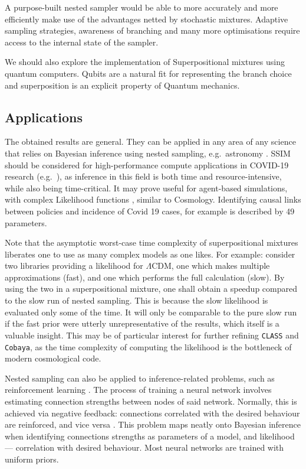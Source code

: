 \documentclass[usenatbib]{mnras}
\begin{document}
A purpose-built nested sampler would be able to more accurately and
more efficiently make use of the advantages netted by stochastic
mixtures. Adaptive sampling strategies, awareness of branching and
many more optimisations require access to the internal state of the
sampler.

We should also explore the implementation of Superpositional mixtures
using quantum computers. Qubits are a natural fit for representing the
branch choice and superposition is an explicit property of Quantum
mechanics.

\subsection{Applications}\label{sec:applications}
The obtained results are general. They can be applied in any area of
any science that relies on Bayesian inference using nested sampling,
e.g.~astronomy \citep{Casado_2016}. SSIM should be considered for
high-performance compute applications in COVID-19 research
(e.g.~\cite{Covid1,Covid2}), as inference in this field is both time
and resource-intensive, while also being time-critical. It may prove
useful for agent-based simulations, with complex Likelihood functions
\citep{Covid2}, similar to Cosmology. Identifying causal links between
policies and incidence of Covid 19 cases, for example is described by
49 parameters.

Note that the asymptotic worst-case time complexity of superpositional
mixtures liberates one to use as many complex models as one likes. For
example: consider two libraries providing a likelihood for
\(\Lambda\)CDM, one which makes multiple approximations (fast), and
one which performs the full calculation (slow). By using the two in a
superpositional mixture, one shall obtain a speedup compared to the
slow run of nested sampling. This is because the slow likelihood is
evaluated only some of the time. It will only be comparable to the
pure slow run if the fast prior were utterly unrepresentative of the
results, which itself is a valuable insight. This may be of particular
interest for further refining \texttt{CLASS} and \texttt{Cobaya}, as
the time complexity of computing the likelihood is the bottleneck of
modern cosmological code.

Nested sampling can also be applied to inference-related problems,
such as reinforcement learning \citep{javid2020}. The process of
training a neural network involves estimating connection strengths
between nodes of said network. Normally, this is achieved via negative
feedback: connections correlated with the desired behaviour are
reinforced, and vice versa \citep{Kaelbling_1996}. This problem maps
neatly onto Bayesian inference when identifying connections strengths
as parameters of a model, and likelihood --- correlation with desired
behaviour. Most neural networks are trained with uniform priors.
\end{document}
